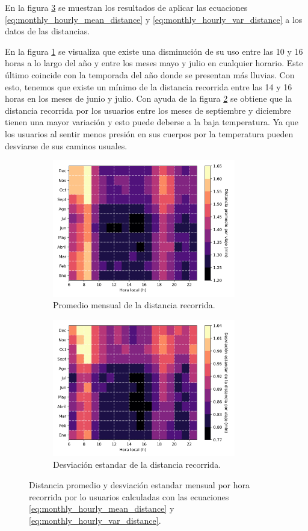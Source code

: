 En la figura \ref{fig:monthly_hourly_distance} se muestran los resultados de aplicar las ecuaciones \ref{eq:monthly_hourly_mean_distance} y \ref{eq:monthly_hourly_var_distance} a los datos de las distancias.

En la figura \ref{fig:monthly_hourly_mean_distance} se visualiza que existe una disminución de su uso entre las 10 y 16 horas a lo largo del año y entre los meses mayo y julio en cualquier horario. Este último coincide con la temporada del año donde se presentan más lluvias\cite{clima_guadalajara}. Con esto, tenemos que existe un mínimo de la distancia recorrida entre las 14 y 16 horas en los meses de junio y julio. Con ayuda de la figura \ref{fig:monthly_hourly_var_distance} se obtiene que la distancia recorrida por los usuarios entre los meses de septiembre y diciembre tienen una mayor variación y esto puede deberse a la baja temperatura\cite{clima_guadalajara}. Ya que los usuarios al sentir menos presión en sus cuerpos por la temperatura pueden desviarse de sus caminos usuales.

\begin{figure}[H]
    \centering
    \begin{subfigure}[b]{8cm}
        \includegraphics[width=8cm]{Graphics/monthly_hourly_mean_distance.png}
        \caption{Promedio mensual de la distancia recorrida.}
        \label{fig:monthly_hourly_mean_distance}
    \end{subfigure}
    \begin{subfigure}[b]{8.5cm}
        \includegraphics[width=8cm]{Graphics/monthly_hourly_var_distance.png}
        \caption{Desviación estandar de la distancia recorrida.}
        \label{fig:monthly_hourly_var_distance}
    \end{subfigure}
    \caption{Distancia promedio y desviación estandar mensual por hora recorrida por lo usuarios calculadas con las ecuaciones \ref{eq:monthly_hourly_mean_distance} y \ref{eq:monthly_hourly_var_distance}.}
    \label{fig:monthly_hourly_distance}
\end{figure}


